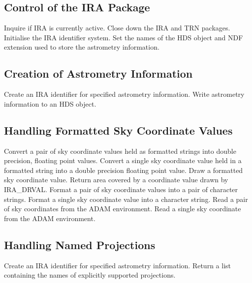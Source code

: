 \subsection {Control of the IRA Package}
   {Inquire if IRA is currently active.}
   {Close down the IRA and TRN packages.}
   {Initialise the IRA identifier system.}
   {Set the names of the HDS object and NDF extension used to store the 
   astrometry information.}

\subsection {Creation of Astrometry Information}
   {Create an IRA identifier for specified astrometry information.}
   {Write astrometry information to an HDS object.}

\subsection {Handling Formatted Sky Coordinate Values}
   {Convert a pair of sky coordinate values held as formatted strings into 
   double precision, floating point values.}
   {Convert a single sky coordinate value held in a formatted string into a 
   double precision floating point value.}
   {Draw a formatted sky coordinate value.}
   {Return area covered by a coordinate value drawn by IRA\_DRVAL.}
   {Format a  pair of sky coordinate values into a pair of character strings.}
   {Format a  single sky coordinate value into a character string.}
   {Read a pair of sky coordinates from the ADAM environment.}
   {Read a single sky coordinate from the ADAM environment.}

\subsection {Handling Named Projections}
   {Create an IRA identifier for specified astrometry information.}
   {Return a list containing the names of explicitly supported projections.}

